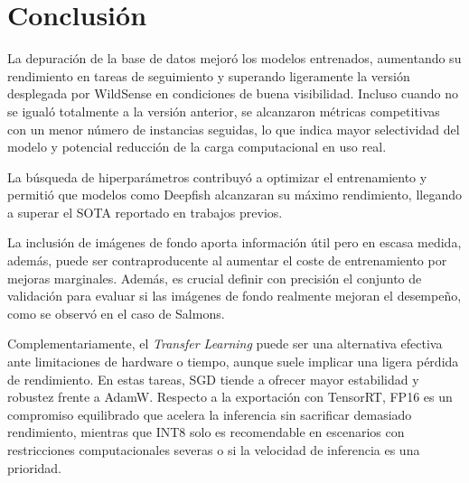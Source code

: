 \section{Conclusión}
La depuración de la base de datos mejoró los modelos entrenados, aumentando su rendimiento en tareas de seguimiento y superando ligeramente la versión desplegada por WildSense en condiciones de buena visibilidad. Incluso cuando no se igualó totalmente a la versión anterior, se alcanzaron métricas competitivas con un menor número de instancias seguidas, lo que indica mayor selectividad del modelo y potencial reducción de la carga computacional en uso real.

La búsqueda de hiperparámetros contribuyó a optimizar el entrenamiento y permitió que modelos como Deepfish alcanzaran su máximo rendimiento, llegando a superar el SOTA reportado en trabajos previos.

La inclusión de imágenes de fondo aporta información útil pero en escasa medida, además, puede ser contraproducente al aumentar el coste de entrenamiento por mejoras marginales. Además, es crucial definir con precisión el conjunto de validación para evaluar si las imágenes de fondo realmente mejoran el desempeño, como se observó en el caso de Salmons.

Complementariamente, el \textit{Transfer Learning} puede ser una alternativa efectiva ante limitaciones de hardware o tiempo, aunque suele implicar una ligera pérdida de rendimiento. En estas tareas, SGD tiende a ofrecer mayor estabilidad y robustez frente a AdamW. Respecto a la exportación con TensorRT, FP16 es un compromiso equilibrado que acelera la inferencia sin sacrificar demasiado rendimiento, mientras que INT8 solo es recomendable en escenarios con restricciones computacionales severas o si la velocidad de inferencia es una prioridad.

